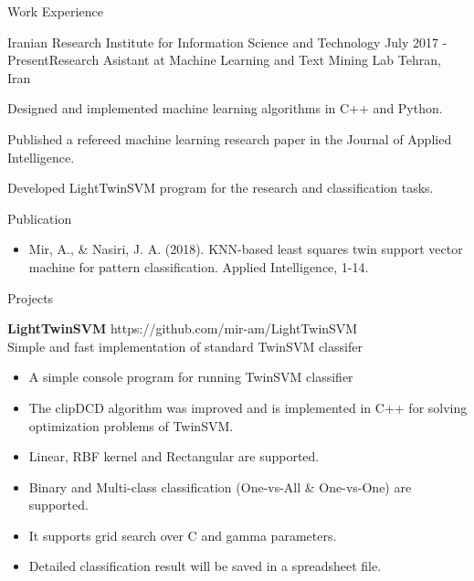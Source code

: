 \documentclass{resume} %
\begin{document}
\begin{rSection}{Work Experience}

\begin{rSubsection}{Iranian Research Institute for Information Science and Technology }{July 2017 - Present}{Research Asistant at Machine Learning and Text Mining Lab }{Tehran, Iran}
\item Designed and implemented machine learning algorithms in C++ and Python.
\item Published a refereed machine learning research paper in the Journal of Applied Intelligence.
\item Developed LightTwinSVM program for the research and classification tasks.
\end{rSubsection}


\end{rSection}

\begin{rSection}{Publication}

\begin{itemize}
	\item Mir, A., \& Nasiri, J. A. (2018). KNN-based least squares twin support vector machine for pattern classification. Applied Intelligence, 1-14.
\end{itemize}
		
\end{rSection}

\begin{rSection}{Projects}
	
	{\bf LightTwinSVM} \hfill { https://github.com/mir-am/LightTwinSVM} \\ 
	Simple and fast implementation of standard TwinSVM classifer  \\
	
	\begin{itemize}
	\item A simple console program for running TwinSVM classifier
	\item The clipDCD algorithm was improved and is implemented in C++ for solving optimization problems of TwinSVM.
	\item Linear, RBF kernel and Rectangular are supported.
	\item Binary and Multi-class classification (One-vs-All \& One-vs-One) are supported.
	\item It supports grid search over C and gamma parameters.
	\item Detailed classification result will be saved in a spreadsheet file.

	\end{itemize}
	
\end{rSection}
\end{document}
